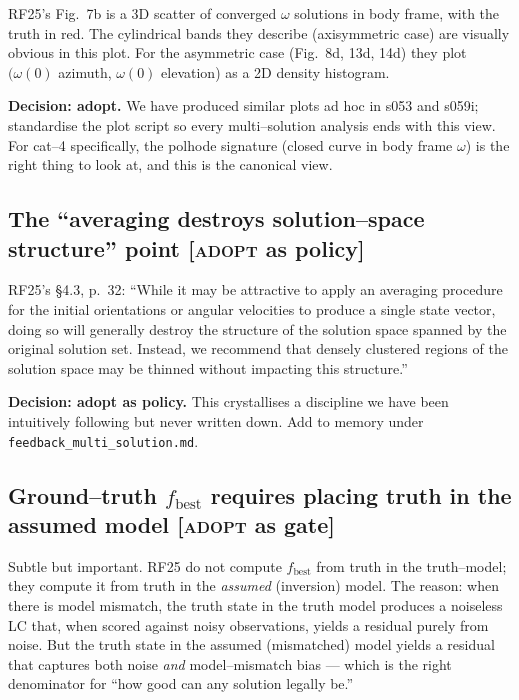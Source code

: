 \documentclass[11pt]{article}
\newcommand{\ttt}[1]{\texttt{#1}}
\begin{document}
\noindent
RF25's Fig.~7b is a 3D scatter of converged $\omega$ solutions in body
frame, with the truth in red. The cylindrical bands they describe (axisymmetric
case) are visually obvious in this plot. For the asymmetric case (Fig.~8d,
13d, 14d) they plot $(\omega(0)$ azimuth, $\omega(0)$ elevation) as a 2D
density histogram.

\textbf{Decision: adopt.} We have produced similar plots ad hoc in s053 and
s059i; standardise the plot script so every multi--solution analysis ends with
this view. For cat--4 specifically, the polhode signature (closed curve in
body frame $\omega$) is the right thing to look at, and this is the canonical
view.

\subsection{The ``averaging destroys solution--space structure'' point \textnormal{[\textsc{adopt} as policy]}}

\noindent
RF25's \S4.3, p.~32: ``While it may be attractive to apply an averaging
procedure for the initial orientations or angular velocities to produce a
single state vector, doing so will generally destroy the structure of the
solution space spanned by the original solution set. Instead, we recommend
that densely clustered regions of the solution space may be thinned without
impacting this structure.''

\textbf{Decision: adopt as policy.} This crystallises a discipline we have
been intuitively following but never written down. Add to memory under
\ttt{feedback\_multi\_solution.md}.

\subsection{Ground--truth $f_{\mathrm{best}}$ requires placing truth in the assumed model \textnormal{[\textsc{adopt} as gate]}}

\noindent
Subtle but important. RF25 do not compute $f_{\mathrm{best}}$ from truth in
the truth--model; they compute it from truth in the \emph{assumed} (inversion)
model. The reason: when there is model mismatch, the truth state in the
truth model produces a noiseless LC that, when scored against noisy
observations, yields a residual purely from noise. But the truth state in
the assumed (mismatched) model yields a residual that captures
both noise \emph{and} model--mismatch bias --- which is the right denominator
for ``how good can any solution legally be.''
\end{document}
